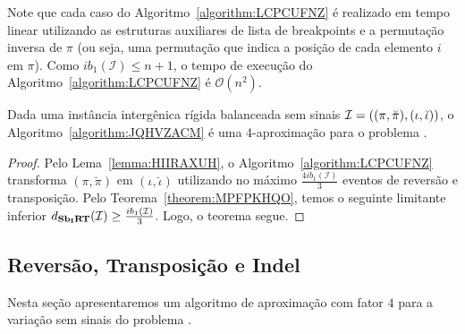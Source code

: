 Note que cada caso do Algoritmo~\ref{algorithm:LCPCUFNZ} é realizado em tempo linear utilizando as estruturas auxiliares de lista de breakpoints e a permutação inversa de $\pi$ (ou seja, uma permutação que indica a posição de cada elemento $i$ em $\pi$). Como $ib_1(\mathcal{I}) \le n + 1$, o tempo de execução do Algoritmo~\ref{algorithm:LCPCUFNZ} é $\mathcal{O}(n^2)$.

\begin{theorem}\label{theorem:USRSHCGH}
Dada uma instância intergênica rígida balanceada sem sinais $\mathcal{I}=\break((\pi,\breve\pi),(\iota,\breve\iota))$, o Algoritmo~\ref{algorithm:JQHVZACM} é uma $4$-aproximação para o problema \SbIRT{}.
\end{theorem}
\begin{proof}
Pelo Lema~\ref{lemma:HIIRAXUH}, o Algoritmo~\ref{algorithm:LCPCUFNZ} transforma $(\pi,\breve\pi)$ em $(\iota,\breve\iota)$ utilizando no máximo $\frac{4ib_1(\mathcal{I})}{3}$ eventos de reversão e transposição. Pelo Teorema~\ref{theorem:MPFPKHQO}, temos o seguinte limitante inferior $d_{\textbf{Sb\textsubscript{I}RT}}(\mathcal{I}) \ge \frac{ib_1(\mathcal{I})}{3}$. Logo, o teorema segue. 
\end{proof}

\subsection{Reversão, Transposição e Indel}

Nesta seção apresentaremos um algoritmo de aproximação com fator $4$ para a variação sem sinais do problema \SbIRTI{}. 

